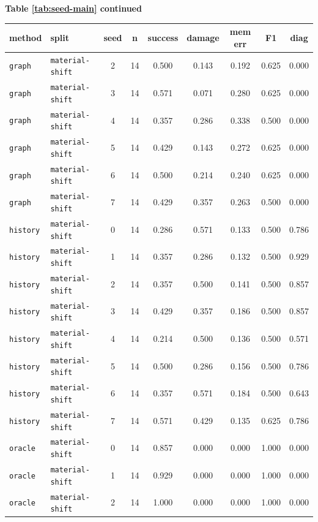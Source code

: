\documentclass{article}
\begin{document}
\begin{center}
\textbf{Table \ref{tab:seed-main} continued}\\[0.4ex]
\begin{tabular}{llccccccc}
\toprule
method & split & seed & n & success & damage & mem err & F1 & diag \\
\midrule
\texttt{graph} & \texttt{material-shift} & 2 & 14 & 0.500 & 0.143 & 0.192 & 0.625 & 0.000 \\
\texttt{graph} & \texttt{material-shift} & 3 & 14 & 0.571 & 0.071 & 0.280 & 0.625 & 0.000 \\
\texttt{graph} & \texttt{material-shift} & 4 & 14 & 0.357 & 0.286 & 0.338 & 0.500 & 0.000 \\
\texttt{graph} & \texttt{material-shift} & 5 & 14 & 0.429 & 0.143 & 0.272 & 0.625 & 0.000 \\
\texttt{graph} & \texttt{material-shift} & 6 & 14 & 0.500 & 0.214 & 0.240 & 0.625 & 0.000 \\
\texttt{graph} & \texttt{material-shift} & 7 & 14 & 0.429 & 0.357 & 0.263 & 0.500 & 0.000 \\
\texttt{history} & \texttt{material-shift} & 0 & 14 & 0.286 & 0.571 & 0.133 & 0.500 & 0.786 \\
\texttt{history} & \texttt{material-shift} & 1 & 14 & 0.357 & 0.286 & 0.132 & 0.500 & 0.929 \\
\texttt{history} & \texttt{material-shift} & 2 & 14 & 0.357 & 0.500 & 0.141 & 0.500 & 0.857 \\
\texttt{history} & \texttt{material-shift} & 3 & 14 & 0.429 & 0.357 & 0.186 & 0.500 & 0.857 \\
\texttt{history} & \texttt{material-shift} & 4 & 14 & 0.214 & 0.500 & 0.136 & 0.500 & 0.571 \\
\texttt{history} & \texttt{material-shift} & 5 & 14 & 0.500 & 0.286 & 0.156 & 0.500 & 0.786 \\
\texttt{history} & \texttt{material-shift} & 6 & 14 & 0.357 & 0.571 & 0.184 & 0.500 & 0.643 \\
\texttt{history} & \texttt{material-shift} & 7 & 14 & 0.571 & 0.429 & 0.135 & 0.625 & 0.786 \\
\texttt{oracle} & \texttt{material-shift} & 0 & 14 & 0.857 & 0.000 & 0.000 & 1.000 & 0.000 \\
\texttt{oracle} & \texttt{material-shift} & 1 & 14 & 0.929 & 0.000 & 0.000 & 1.000 & 0.000 \\
\texttt{oracle} & \texttt{material-shift} & 2 & 14 & 1.000 & 0.000 & 0.000 & 1.000 & 0.000 \\

\end{tabular}
\end{center}
\end{document}
